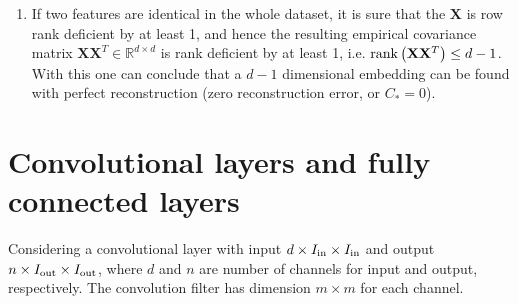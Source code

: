 \documentclass[a4paper, 10pt]{article}
\begin{document}
\begin{enumerate}[label=(\alph*)]
    \item If two features are identical in the whole dataset, it is sure that the $\mathbf{X}$ is row rank deficient by at least 1, and hence the resulting empirical covariance matrix $\mathbf{X} \mathbf{X}^T \in \mathbb{R}^{d\times d}$ is rank deficient by at least 1, i.e. ${\rm rank}\left(\mathbf{X}\mathbf{X}^T\right) \leq d - 1$. With this one can conclude that a $d-1$ dimensional embedding can be found with perfect reconstruction (zero reconstruction error, or $C_*=0$).
\end{enumerate}


\section{Convolutional layers and fully connected layers}
Considering a convolutional layer with input $d\times I_{\rm in}\times I_{\rm in}$ and output $n\times I_{\rm out}\times I_{\rm out}$, where $d$ and $n$ are number of channels for input and output, respectively. The convolution filter has dimension $m\times m$ for each channel.
\end{document}
